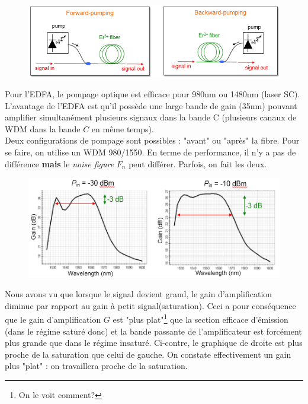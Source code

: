 	\begin{figure}
	\vspace{-5mm}
	\includegraphics[scale=0.4]{ch6/image5}
	\end{figure}
Pour l'EDFA, le pompage optique est efficace pour 980nm ou 1480nm (laser SC). L'avantage de l'EDFA est
qu'il possède une large bande de gain (35nm) pouvant amplifier simultanément plusieurs signaux dans
la bande C (plusieurs canaux de WDM dans la bande $C$ en même temps).\\

Deux configurations de pompage sont possibles : "avant" ou "après" la fibre. Pour se faire, on utilise
un WDM 980/1550. En terme de performance, il n'y a pas de différence \textbf{mais} le \textit{noise
figure} $F_n$ peut différer. Parfois, on fait les deux.\\

	\begin{figure}
	\vspace{-7mm}
	\includegraphics[scale=0.5]{ch6/image6}
	\end{figure}
Nous avons vu que lorsque le signal devient grand, le gain d'amplification diminue par rapport au gain 
à petit signal(saturation). Ceci a pour conséquence que le gain d'amplification $G$ est 
"plus plat"\footnote{On le voit comment?} que la section efficace d'émission (dans le régime saturé
donc) et la bande passante de l'amplificateur est forcément plus grande que dans le régime insaturé. 
Ci-contre, le graphique de droite est plus proche de la saturation que celui de gauche. On constate 
effectivement un gain plus "plat" : on travaillera proche de la saturation.


